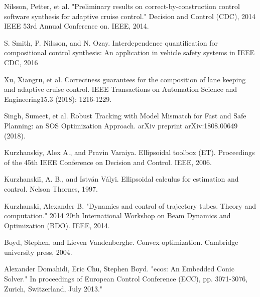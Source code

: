 \begin{thebibliography}{9}

Nilsson, Petter, et al. "Preliminary results on correct-by-construction control software synthesis for adaptive cruise control." Decision and Control (CDC), 2014 IEEE 53rd Annual Conference on. IEEE, 2014.

S. Smith, P. Nilsson, and N. Ozay.
Interdependence quantification for compositional control synthesis: An application in vehicle safety systems in IEEE CDC, 2016

Xu, Xiangru, et al.
Correctness guarantees for the composition of lane keeping and adaptive cruise control.
IEEE Transactions on Automation Science and Engineering15.3 (2018): 1216-1229.

Singh, Sumeet, et al. 
Robust Tracking with Model Mismatch for Fast and Safe Planning: an SOS Optimization Approach.
arXiv preprint arXiv:1808.00649 (2018).

Kurzhanskiy, Alex A., and Pravin Varaiya.
Ellipsoidal toolbox (ET).
Proceedings of the 45th IEEE Conference on Decision and Control. IEEE, 2006.

Kurzhanskiĭ, A. B., and István Vályi. Ellipsoidal calculus for estimation and control. Nelson Thornes, 1997.

Kurzhanski, Alexander B. "Dynamics and control of trajectory tubes. Theory and computation." 2014 20th International Workshop on Beam Dynamics and Optimization (BDO). IEEE, 2014.

Boyd, Stephen, and Lieven Vandenberghe. Convex optimization. Cambridge university press, 2004.

Alexander Domahidi, Eric Chu, Stephen Boyd. "ecos: An Embedded
Conic Solver." In proceedings of European Control Conference (ECC), 
pp. 3071-3076, Zurich, Switzerland, July 2013."

\end{thebibliography}